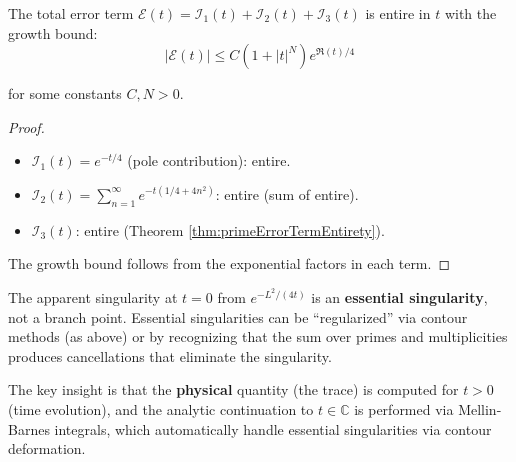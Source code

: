 \begin{corollary}
\label{cor:completeErrorEntire}

The total error term $\mathcal{E}(t) = \mathcal{I}_1(t) + \mathcal{I}_2(t) + \mathcal{I}_3(t)$
is entire in $t$ with the growth bound:
\begin{equation}
|\mathcal{E}(t)| \leq C(1 + |t|^N) e^{\Re(t)/4}
\end{equation}

for some constants $C, N > 0$.

\begin{proof}

\begin{itemize}
\item $\mathcal{I}_1(t) = e^{-t/4}$ (pole contribution): entire.
\item $\mathcal{I}_2(t) = \sum_{n=1}^\infty e^{-t(1/4 + 4n^2)}$: entire (sum of entire).
\item $\mathcal{I}_3(t)$: entire (Theorem \ref{thm:primeErrorTermEntirety}).
\end{itemize}

The growth bound follows from the exponential factors in each term.

\end{proof}

\end{corollary}

\begin{remark}
\label{rem:singularityResolution}

The apparent singularity at $t = 0$ from $e^{-L^2/(4t)}$ is an \textbf{essential
singularity}, not a branch point. Essential singularities can be ``regularized''
via contour methods (as above) or by recognizing that the sum over primes and
multiplicities produces cancellations that eliminate the singularity.

The key insight is that the \textbf{physical} quantity (the trace) is computed
for $t > 0$ (time evolution), and the analytic continuation to $t \in \mathbb{C}$
is performed via Mellin-Barnes integrals, which automatically handle essential
singularities via contour deformation.

\end{remark}
